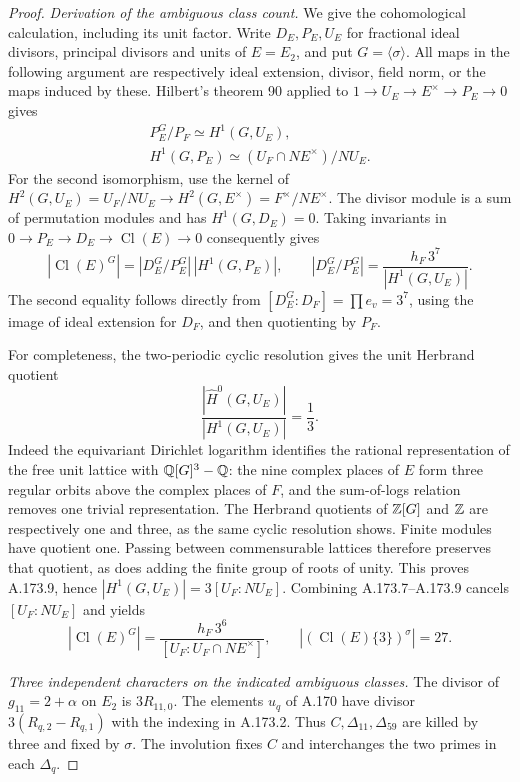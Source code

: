 \begin{proof}
\emph{Derivation of the ambiguous class count.}
We give the cohomological calculation, including its unit factor.
Write \(D_E,P_E,U_E\) for fractional ideal divisors, principal
divisors and units of \(E=E_2\), and put \(G=\langle\sigma\rangle\).
All maps in the following argument are respectively ideal
extension, divisor, field norm, or the maps induced by these.
Hilbert's theorem 90 applied to
\(1\to U_E\to E^\times\to P_E\to0\) gives
\[
 \begin{gathered}
 P_E^G/P_F\simeq H^1(G,U_E),\\
 H^1(G,P_E)\simeq
       (U_F\cap N E^\times)/N U_E.
 \end{gathered}
\tag{A.173.7}
\]
For the second isomorphism, use the kernel of
\(H^2(G,U_E)=U_F/NU_E\to H^2(G,E^\times)=F^\times/NE^\times\).
The divisor module is a sum of permutation modules and has
\(H^1(G,D_E)=0\).  Taking invariants in
\(0\to P_E\to D_E\to\operatorname{Cl}(E)\to0\) consequently gives
\[
 |\operatorname{Cl}(E)^G|
    =|D_E^G/P_E^G|\,|H^1(G,P_E)|,
 \qquad
 |D_E^G/P_E^G|
    =\frac{h_F\,3^7}{|H^1(G,U_E)|}.
\tag{A.173.8}
\]
The second equality follows directly from
\([D_E^G:D_F]=\prod e_v=3^7\), using the image of ideal
extension for \(D_F\), and then quotienting by \(P_F\).

For completeness, the two-periodic cyclic resolution gives the
unit Herbrand quotient
\[
 \frac{|\widehat H^0(G,U_E)|}{|H^1(G,U_E)|}=\frac13.
\tag{A.173.9}
\]
Indeed the equivariant Dirichlet logarithm identifies the
rational representation of the free unit lattice with
\(\mathbb Q[G]^3-\mathbb Q\): the nine complex places of \(E\) form three
regular orbits above the complex places of \(F\), and the
sum-of-logs relation removes one trivial representation.
The Herbrand quotients of \(\mathbb Z[G]\) and \(\mathbb Z\) are respectively
one and three, as the same cyclic resolution shows.
Finite modules have quotient one.  Passing between commensurable
lattices therefore preserves that quotient, as does adding the
finite group of roots of unity.  This proves A.173.9, hence
\(|H^1(G,U_E)|=3[U_F:NU_E]\).
Combining A.173.7--A.173.9 cancels \([U_F:NU_E]\) and yields
\[
 |\operatorname{Cl}(E)^G|
  =\frac{h_F\,3^6}{[U_F:U_F\cap NE^\times]},
 \qquad
 |(\operatorname{Cl}(E)\{3\})^\sigma|=27.
\tag{A.173.10}
\]

\emph{Three independent characters on the indicated ambiguous classes.}
The divisor of \(g_{11}=2+\alpha\) on \(E_2\) is
\(3R_{11,0}\).  The elements \(u_q\) of A.170 have divisor
\(3(R_{q,2}-R_{q,1})\) with the indexing in A.173.2.
Thus \(C,\Delta_{11},\Delta_{59}\) are killed by three and
fixed by \(\sigma\).  The involution fixes \(C\) and interchanges
the two primes in each \(\Delta_q\).


\end{proof}
